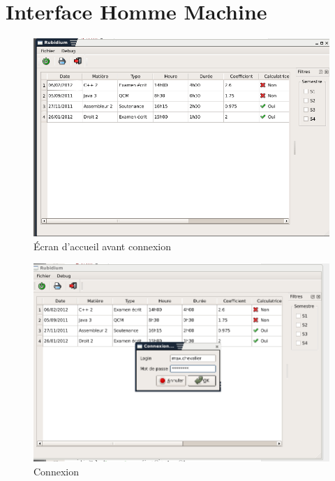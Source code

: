 \chapter{Interface Homme Machine}\label{ihm}

\begin{figure}[H]
	\begin{center}
		\includegraphics[width=15cm]{images/ihm_avantConnexion.png}
	\end{center}
	\caption{Écran d'accueil avant connexion}
\end{figure}

\begin{figure}[H]
	\begin{center}
		\includegraphics[width=15cm]{images/ihm_connexion.png}
	\end{center}
	\caption{Connexion}
\end{figure}

